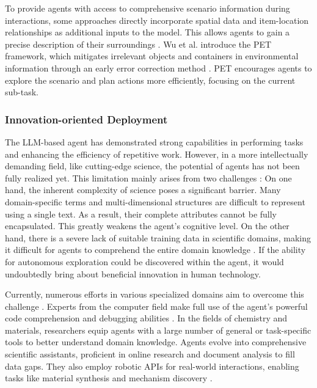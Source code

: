 To provide agents with access to comprehensive scenario information during interactions, some approaches directly incorporate spatial data and item-location relationships as additional inputs to the model. This allows agents to gain a precise description of their surroundings \cite{DBLP:journals/corr/abs-2308-01552, DBLP:journals/corr/abs-2210-04964}. Wu et al. \cite{DBLP:journals/corr/abs-2305-02412} introduce the PET framework, which mitigates irrelevant objects and containers in environmental information through an early error correction method \cite{DBLP:journals/corr/abs-2211-09935}. PET encourages agents to explore the scenario and plan actions more efficiently, focusing on the current sub-task.

\subsubsection{Innovation-oriented Deployment}\label{sec:Innovation-Oriented Deployment}
The LLM-based agent has demonstrated strong capabilities in performing tasks and enhancing the efficiency of repetitive work. However, in a more intellectually demanding field, like cutting-edge science, the potential of agents has not been fully realized yet. This limitation mainly arises from two challenges \cite{DBLP:journals/corr/abs-2308-01423}: On one hand, the inherent complexity of science poses a significant barrier. Many domain-specific terms and multi-dimensional structures are difficult to represent using a single text. As a result, their complete attributes cannot be fully encapsulated. This greatly weakens the agent's cognitive level. On the other hand, there is a severe lack of suitable training data in scientific domains, making it difficult for agents to comprehend the entire domain knowledge \cite{DBLP:conf/emnlp/WangJCA22, DBLP:journals/corr/abs-2305-05091}. If the ability for autonomous exploration could be discovered within the agent, it would undoubtedly bring about beneficial innovation in human technology.

Currently, numerous efforts in various specialized domains aim to overcome this challenge \cite{DBLP:journals/corr/abs-2306-15626, lin2023evolutionary, DBLP:journals/mlst/IrwinDHB22}. Experts from the computer field make full use of the agent's powerful code comprehension and debugging abilities \cite{DBLP:journals/corr/abs-2306-05152, DBLP:journals/corr/abs-2308-00245}. In the fields of chemistry and materials, researchers equip agents with a large number of general or task-specific tools to better understand domain knowledge. Agents evolve into comprehensive scientific assistants, proficient in online research and document analysis to fill data gaps. They also employ robotic APIs for real-world interactions, enabling tasks like material synthesis and mechanism discovery \cite{DBLP:journals/corr/abs-2304-05332, bran2023chemcrow,  DBLP:journals/corr/abs-2308-01423}.

